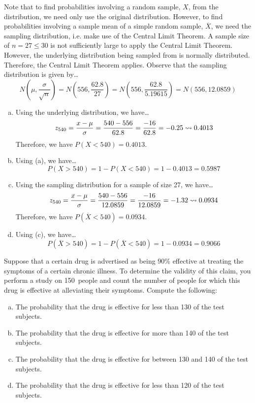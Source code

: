 \documentclass[11pt,letterpaper]{article}
\begin{document}
\sol Note that to find probabilities involving a random sample, $X$, from the distribution, we need only use the original distribution. However, to find probabilities involving a sample mean of a simple random sample, $\overline{X}$, we need the sampling distribution, i.e. make use of the Central Limit Theorem. A sample size of $n= 27 \leq 30$ is not sufficiently large to apply the Central Limit Theorem. However, the underlying distribution being sampled from is normally distributed. Therefore, the Central Limit Theorem applies. Observe that the sampling distribution is given by\dots
	\[
	N\left( \mu, \dfrac{\sigma}{\sqrt{n}} \right)= N\left( 556, \dfrac{62.8}{27} \right)= N\left( 556, \dfrac{62.8}{5.19615} \right)= N\left( 556, 12.0859 \right)
	\] \pspace

\begin{enumerate}[(a)]
\item Using the underlying distribution, we have\dots
	\[
	z_{540}= \dfrac{x - \mu}{\sigma}= \dfrac{540 - 556}{62.8}= \dfrac{-16}{62.8}= -0.25 \rightsquigarrow 0.4013
	\]
Therefore, we have $P(X < 540)= 0.4013$. \pspace

\item Using (a), we have\dots
	\[
	P(X > 540)= 1 - P(X < 540)= 1 - 0.4013= 0.5987
	\] \pspace

\item Using the sampling distribution for a sample of size 27, we have\dots
	\[
	z_{540}= \dfrac{x - \mu}{\sigma}= \dfrac{540 - 556}{12.0859}= \dfrac{-16}{12.0859}= -1.32 \rightsquigarrow 0.0934
	\]
Therefore, we have $P(\overline{X} < 540)= 0.0934$. \pspace

\item Using (c), we have\dots
	\[
	P(\overline{X} > 540)= 1 - P(\overline{X} < 540)= 1 - 0.0934= 0.9066
	\]
\end{enumerate}



\newpage



 Suppose that a certain drug is advertised as being 90\% effective at treating the symptoms of a certain chronic illness. To determine the validity of this claim, you perform a study on 150~people and count the number of people for which this drug is effective at alleviating their symptoms. Compute the following:
	\begin{enumerate}[(a)]
	\item The probability that the drug is effective for less than 130 of the test subjects.
	\item The probability that the drug is effective for more than 140 of the test subjects.
	\item The probability that the drug is effective for between 130 and 140 of the test subjects.
	\item The probability that the drug is effective for less than 120 of the test subjects. 
	\end{enumerate} \pspace
\end{document}
